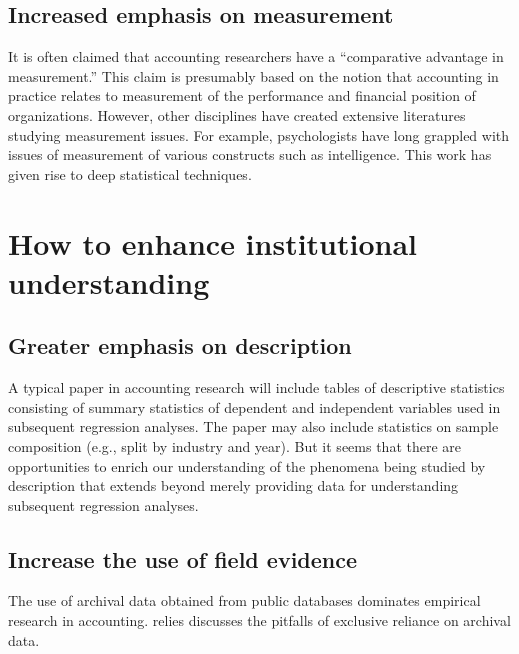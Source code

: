 \documentclass[11pt]{amsart}
\begin{document}
\subsection{Increased emphasis on measurement}
It is often claimed that accounting researchers have a ``comparative advantage in measurement.'' This claim is presumably based on the notion that accounting in practice relates to measurement of the performance and financial position of organizations. However, other disciplines have created extensive literatures studying measurement issues. For example, psychologists have long grappled with issues of measurement of various constructs such as intelligence. This work has given rise to deep statistical techniques.

\section{How to enhance institutional understanding}

\subsection{Greater emphasis on description}
A typical paper in accounting research will include tables of descriptive statistics consisting of summary statistics of dependent and independent variables used in subsequent regression analyses. The paper may also include statistics on sample composition (e.g., split by industry and year). But it seems that there are opportunities to enrich our understanding of the phenomena being studied by description that extends beyond merely providing data for understanding subsequent regression analyses.

\subsection{Increase the use of field evidence}

The use of archival data obtained from public databases dominates empirical research in accounting. relies \cite{Soltes:2014gr} discusses the pitfalls of exclusive reliance on archival data. 


\end{document}
